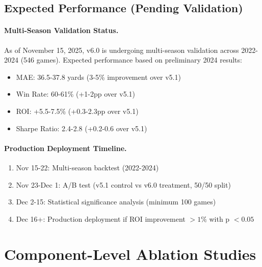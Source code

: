 \subsection{Expected Performance (Pending Validation)}

\paragraph{Multi-Season Validation Status.}
As of November 15, 2025, v6.0 is undergoing multi-season validation across 2022-2024 (546 games). Expected performance based on preliminary 2024 results:

\begin{itemize}[itemsep=2pt,parsep=0pt]
    \item MAE: 36.5-37.8 yards (3-5\% improvement over v5.1)
    \item Win Rate: 60-61\% (+1-2pp over v5.1)
    \item ROI: +5.5-7.5\% (+0.3-2.3pp over v5.1)
    \item Sharpe Ratio: 2.4-2.8 (+0.2-0.6 over v5.1)
\end{itemize}

\paragraph{Production Deployment Timeline.}
\begin{enumerate}[itemsep=2pt,parsep=0pt]
    \item Nov 15-22: Multi-season backtest (2022-2024)
    \item Nov 23-Dec 1: A/B test (v5.1 control vs v6.0 treatment, 50/50 split)
    \item Dec 2-15: Statistical significance analysis (minimum 100 games)
    \item Dec 16+: Production deployment if ROI improvement $> 1\%$ with p $< 0.05$
\end{enumerate}

\section{Component-Level Ablation Studies}
\label{sec:arch-ablation}


